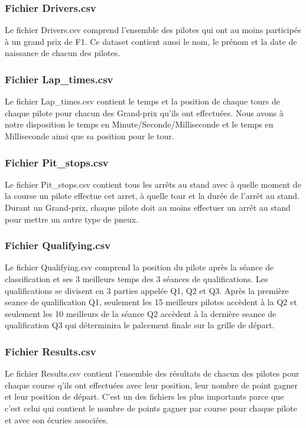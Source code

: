 \subsubsection{Fichier Drivers.csv}
Le fichier Drivers.csv comprend l'ensemble des pilotes qui ont au moins participés à un grand prix de F1. Ce dataset contient aussi le nom, le prénom et la date de naissance de chacun des pilotes.

\subsubsection{Fichier Lap\_times.csv}
Le fichier Lap\_times.csv contient le temps et la position de chaque tours de chaque pilote pour chacun des Grand-prix qu'ils ont effectuées. Nous avons à notre disposition le temps en Minute/Seconde/Milliseconde et le temps en Milliseconde ainsi que sa position pour le tour.

\subsubsection{Fichier Pit\_stops.csv}
Le fichier Pit\_stops.csv contient tous les arrêts au stand avec à quelle moment de la course un pilote effectue cet arret, à quelle tour et la durée de l'arrêt au stand. Durant un Grand-prix, chaque pilote doit au moins effectuer un arrêt au stand pour mettre un autre type de pneux.

\subsubsection{Fichier Qualifying.csv}
Le fichier Qualifying.csv comprend la position du pilote après la séance de classification et ses 3 meilleurs temps des 3 séances de qualifications. Les qualifications se divisent en 3 parties appelée Q1, Q2 et Q3. Après la première seance de qualification Q1, seulement les 15 meilleurs pilotes accèdent à la Q2 et seulement les 10 meilleurs de la séance Q2 accèdent à la dernière seance de qualification Q3 qui déterminira le palcement finale sur la grille de départ.

\subsubsection{Fichier Results.csv}
Le fichier Results.csv contient l'ensemble des résultats de chacun des pilotes pour chaque course q'ils ont effectuées avec leur position, leur nombre de point gagner et leur position de départ. C'est un des fichiers les plus importants parce que c'est celui qui contient le nombre de points gagner par course pour chaque pilote et avec son écuries associées.

